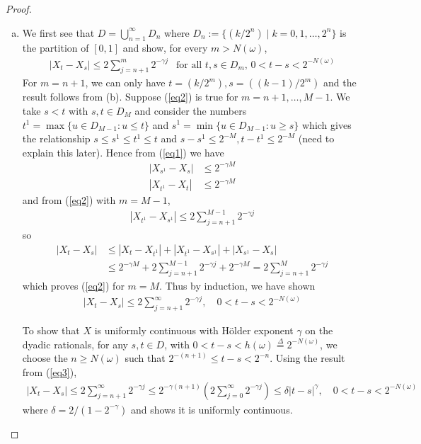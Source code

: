 \documentclass[a4paper,12pt]{article}
\theoremstyle{definition}
\begin{document}
\begin{proof}
\begin{enumerate}[(a)]
\item
We first see that $D = \bigcup_{n=1}^{\infty}D_n$ where $D_n:=\{(k/2^n)\mid k=0,1,\ldots, 2^n\}$ is the partition of $[0,1]$ and show, for every $m>N(\omega)$, 
\begin{align}
|X_t - X_s| \leq 2 \sum_{j=n+1}^{m}2^{-\gamma j} ~~\text{ for all $t,s \in D_m$, }0 < t-s < 2^{-N(\omega)} \label{eq2}
\end{align}
For $m=n+1$, we can only have $t = (k/2^m), s = ((k-1)/2^m)$ and the result follows from (b). Suppose (\ref{eq2}) is true for $m = n+1, \ldots, M-1$. We take $s<t$ with $s,t \in D_{M}$ and consider the numbers $t^1 = \max \{u \in D_{M-1}: u \leq t\}$ and $s^1=\min\{u \in D_{M-1}:u \geq s\}$ which gives the relationship $s \leq s^1\leq t^1 \leq t$ and  $s-s^1 \leq 2^{-M},  t-t^1\leq 2^{-M}$ (need to explain this later). Hence from (\ref{eq1}) we have 
\begin{align*}
|X_{s^1}-X_s| &\leq 2^{-\gamma M}\\
|X_{t^1}-X_t| &\leq 2^{-\gamma M}
\end{align*}
and from (\ref{eq2}) with $m=M-1$, 
\begin{align*}
|X_{t^1}-X_{s^1}| \leq 2 \sum_{j=n+1}^{M-1}2^{-\gamma j}
\end{align*}
so
\begin{align*}
|X_t-X_s|&\leq |X_t-X_{t^1}|+|X_{t^1}-X_{s^1}|+|X_{s^1}-X_s|\\
&\leq 2^{-\gamma M} +2 \sum_{j=n+1}^{M-1}2^{-\gamma j} + 2^{-\gamma M}=2 \sum_{j=n+1}^{M}2^{-\gamma j}
\end{align*}
which proves (\ref{eq2}) for $m=M$. Thus by induction, we have shown
\begin{align}
|X_{t}-X_{s}| \leq 2 \sum_{j=n+1}^{\infty}2^{-\gamma j},\quad 0<t-s<2^{-N(\omega)}\label{eq3}
\end{align}



To show that $X$ is uniformly continuous with H\"{o}lder exponent $\gamma$ on the dyadic rationals, for any $s, t \in D$, with $0< t-s<h(\omega) \overset{\Delta}{=}2^{-N(\omega)}$, we choose the $n \geq N(\omega)$ such that $2^{-(n+1)}\leq t-s<2^{-n}$. Using the result from (\ref{eq3}),
\begin{align}
|X_t-X_s| \leq 2 \sum_{j=n+1}^{\infty}2^{-\gamma j}\leq 2^{-\gamma(n+1)}\left(2 \sum_{j=0}^{\infty}2^{-\gamma j}\right) \leq \delta |t-s|^\gamma, \quad 0<t-s<2^{-N(\omega)} \label{eq4}
\end{align}
where $\delta = 2/(1-2^{-\gamma})$ and shows it is uniformly continuous.







\end{enumerate}
\end{proof}
\end{document}

